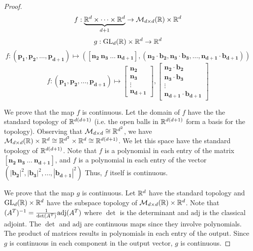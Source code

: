 \documentclass[letterpaper,titlepage]{article}
\begin{document}
\begin{proof}
        $$f:\underbrace{\mathbb{R}^d \times \dots \times \mathbb{R}^d}_{d+1} \to \mathcal{M}_{d\times d}(\mathbb{R})\times \mathbb{R}^d$$
        $$g:\text{GL}_d(\mathbb{R})\times \mathbb{R}^d \to \mathbb{R}^d$$
        $$f:(\mathbf{p_1},\mathbf{p_2},\dots,\mathbf{p_{d+1}}) \mapsto \left(\left[\mathbf{n_2}\ \mathbf{n_3}\ \dots\ \mathbf{n_{d+1}}\right],\left(\mathbf{n_2}\cdot\mathbf{b_2},\mathbf{n_3}\cdot\mathbf{b_3},\dots, \mathbf{n_{d+1}}\cdot\mathbf{b_{d+1}}\right)\right)$$
        $$f:(\mathbf{p_1},\mathbf{p_2},\dots,\mathbf{p_{d+1}}) \mapsto \begin{bmatrix}
            \mathbf{n_2}\\ \mathbf{n_3}\\ \vdots\\ \mathbf{n_{d+1}}
        \end{bmatrix},
        \begin{bmatrix}
            \mathbf{n_2}\cdot\mathbf{b_2} \\ \mathbf{n_3}\cdot\mathbf{b_3}\\ \vdots \\ \mathbf{n_{d+1}}\cdot\mathbf{b_{d+1}}
        \end{bmatrix}$$
            
    
        We prove that the map $f$ is continuous. Let the domain of $f$ have the the standard topology of $\mathbb{R}^{d(d+1)}$ (i.e. the open balls in $\mathbb{R}^{d(d+1)}$ form a basis for the topology). Observing that $\mathcal{M}_{d\times d} \cong \mathbb{R}^{d^2}$, we have $\mathcal{M}_{d\times d}(\mathbb{R})\times \mathbb{R}^d \cong \mathbb{R}^{d^2}\times \mathbb{R}^d \cong \mathbb{R}^{d(d+1)}$. We let this space have the standard topology of $\mathbb{R}^{d(d+1)}$. Note that $f$ is a polynomial in each entry of the matrix $\left[\mathbf{n_2}\ \mathbf{n_3}\ \dots\ \mathbf{n_{d+1}}\right]$, and $f$ is a polynomial in each entry of the vector $(\left|\mathbf{b_2}\right|^2, \left|\mathbf{b_3}\right|^2,\dots,\left|\mathbf{b_{d+1}}\right|^2)$ Thus, $f$ itself is continuous.

        We prove that the map $g$ is continuous. Let $\mathbb{R}^d$ have the standard topology and $\text{GL}_d(\mathbb{R})\times \mathbb{R}^d$ have the subspace topology of $\mathcal{M}_{d\times d}(\mathbb{R})\times \mathbb{R}^d$. Note that $(A^T)^{-1}=\frac{1}{\det(A^T)}\text{adj}(A^T)$ where $\det$ is the determinant and $\text{adj}$ is the classical adjoint. The $\det$ and $\text{adj}$ are continuous maps since they involve polynomials. The product of matrices results in polynomials in each entry of the output. Since $g$ is continuous in each component in the output vector, $g$ is continuous.
        

\end{proof}
\end{document}
